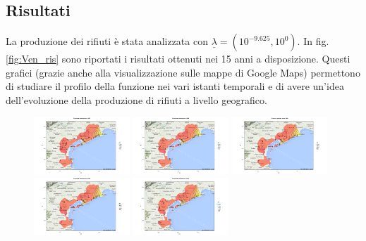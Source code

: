 \documentclass[a4paper,11pt,twoside,openright]{book}							%
\begin{document}
\subsection{Risultati}
La produzione dei rifiuti è stata analizzata con $\underline \lambda = (10^{-9.625}, 10^{0})$. In fig. \ref{fig:Ven_ris} sono riportati i risultati ottenuti nei 15 anni a disposizione. Questi grafici (grazie anche alla visualizzazione sulle mappe di Google Maps) permettono di studiare il profilo della funzione nei vari istanti temporali e di avere un'idea dell'evoluzione della produzione di rifiuti a livello geografico.
\newpage
\begin{figure}[H]
\centering
	\includegraphics[trim=0cm 0cm 4cm 0cm,clip=true,width=0.32\textwidth]{Immagini/venezia_senza_covariate/Maps1997.png}
	\includegraphics[trim=0cm 0cm 4cm 0cm,clip=true,width=0.32\textwidth]{Immagini/venezia_senza_covariate/Maps1998.png}
	\includegraphics[trim=0cm 0cm 4cm 0cm,clip=true,width=0.32\textwidth]{Immagini/venezia_senza_covariate/Maps1999.png}
	\includegraphics[trim=0cm 0cm 4cm 0cm,clip=true,width=0.32\textwidth]{Immagini/venezia_senza_covariate/Maps2000.png}
	\includegraphics[trim=0cm 0cm 4cm 0cm,clip=true,width=0.32\textwidth]{Immagini/venezia_senza_covariate/Maps2001.png}

\end{figure}
\end{document}
